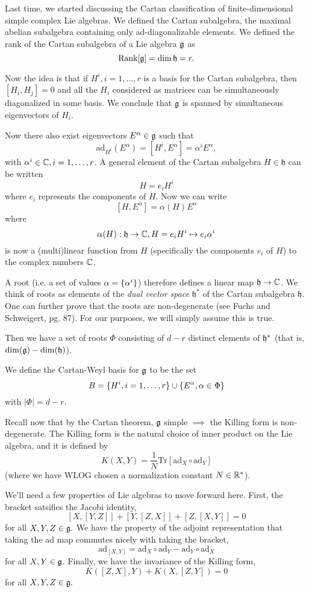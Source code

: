 Last time, we started discussing the Cartan classification of finite-dimensional simple complex Lie algebras. We defined the Cartan subalgebra, the maximal abelian subalgebra containing only ad-diagonalizable elements. We defined the rank of the Cartan subalgebra of a Lie algebra $\mathfrak{g}$ as
$$\text{Rank}[\mathfrak{g}]=\dim \mathfrak{h} = r.$$

Now the idea is that if $H^i,i=1,\ldots,r$ is a basis for the Cartan subalgebra, then $[H_i,H_j]=0$ and all the $H_i$ considered as matrices can be simultaneously diagonalized in some basis. We conclude that $\mathfrak{g}$ is spanned by simultaneous eigenvectors of $H_i$.

Now there also exist eigenvectors $E^\alpha \in \mathfrak{g}$ such that
$$\text{ad}_{H^i}(E^\alpha)=[H^i, E^\alpha]=\alpha^i E^\alpha,$$
with $\alpha^i\in \mathbb{C},i=1,\ldots,r$. A general element of the Cartan subalgebra $H\in \mathfrak{h}$ can be written
$$H=e_i H^i$$
where $e_i$ represents the components of $H$. Now we can write
$$[H,E^\alpha]=\alpha(H)E^\alpha$$
where $$\alpha(H):\mathfrak{h} \to \mathbb{C}, H=e_i H^i \mapsto e_i \alpha^i$$ is now a (multi)linear function from $H$ (specifically the components $e_i$ of $H$) to the complex numbers $\mathbb{C}$.

A root (i.e. a set of values $\alpha=\{\alpha^i\}$) therefore defines a linear map $\mathfrak{h}\to \mathbb{C}$. We think of roots as elements of the \emph{dual vector space} $\mathfrak{h}^*$ of the Cartan subalgebra $\mathfrak{h}$. One can further prove that the roots are non-degenerate (see Fuchs and Schweigert, pg. 87). For our purposes, we will simply assume this is true.

Then we have a set of roots $\Phi$ consisting of $d-r$ distinct elements of $\mathfrak{h}^*$ (that is, $\dim(\mathfrak{g})-\dim(\mathfrak{h})$). 
\begin{defn}
We define the Cartan-Weyl basis for $\mathfrak{g}$ to be the set
$$B=\{H^i,i=1,\ldots,r\}\cup \{E^\alpha, \alpha \in \Phi\}$$
with $|\Phi|=d-r$.
\end{defn}

Recall now that by the Cartan theorem, $\mathfrak{g}$ simple $\implies$ the Killing form is non-degenerate. The Killing form is the natural choice of inner product on the Lie algebra, and it is defined by
$$K(X,Y)=\frac{1}{N}\text{Tr}[\text{ad}_X \circ \text{ad}_Y]$$
(where we have WLOG chosen a normalization constant $N\in\mathbb{R}^*$).

We'll need a few properties of Lie algebras to move forward here. First, the bracket satsifies the Jacobi identity,
\begin{equation}\label{jacobi}
    [X,[Y,Z]]+[Y,[Z,X]]+[Z,[X,Y]]=0
\end{equation}
for all $X,Y,Z\in \mathfrak{g}.$
We have the property of the adjoint representation that taking the ad map commutes nicely with taking the bracket,
\begin{equation}
    \text{ad}_{[X,Y]}=\text{ad}_X \circ \text{ad}_Y-\text{ad}_Y \circ \text{ad}_X
\end{equation}
for all $X,Y\in \mathfrak{g}$.
Finally, we have the invariance of the Killing form,
\begin{equation}\label{killinginvariance}
    K([Z,X],Y)+K(X,[Z,Y])=0
\end{equation}
for all $X,Y,Z\in \mathfrak{g}.$

